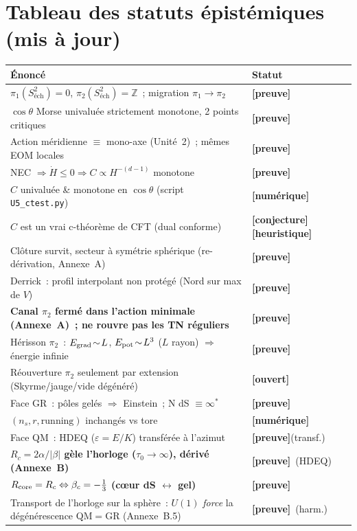 \documentclass[11pt]{article}
\newcommand{\preuve}{{\small\textbf{[preuve]}}}
\newcommand{\num}{{\small\textbf{[num\'erique]}}}
\newcommand{\conj}{{\small\textbf{[conjecture]}}}
\newcommand{\heur}{{\small\textbf{[heuristique]}}}
\newcommand{\ouv}{{\small\textbf{[ouvert]}}}
\newcommand{\Npole}{\mathrm{N}}
\newcommand{\Stwo}{S^2_{\text{\'ech}}}
\theoremstyle{definition}
\begin{document}
\section*{Tableau des statuts \'epist\'emiques (mis \`a jour)}
\begin{center}\footnotesize
\renewcommand{\arraystretch}{1.05}
\begin{tabular}{p{11.0cm} l}
\toprule
\textbf{\'Enonc\'e} & \textbf{Statut}\\
\midrule
$\pi_1(\Stwo)=0$, $\pi_2(\Stwo)=\mathbb{Z}$~; migration $\pi_1\to\pi_2$ & \preuve\\
$\cos\theta$ Morse univalu\'ee strictement monotone, 2 points critiques & \preuve\\
Action m\'eridienne $\equiv$ mono-axe (Unit\'e~2)~; m\^emes EOM locales & \preuve\\
NEC $\Rightarrow\dot H\le0\Rightarrow C\propto H^{-(d-1)}$ monotone & \preuve\\
$C$ univalu\'ee \& monotone en $\cos\theta$ (script \texttt{U5\_ctest.py}) & \num\\
$C$ est un vrai c-th\'eor\`eme de CFT (dual conforme) & \conj\,\heur\\
Cl\^oture survit, secteur \`a sym\'etrie sph\'erique (re-d\'erivation, Annexe~A) & \preuve\\
Derrick~: profil interpolant non prot\'eg\'e (Nord sur max de $V$) & \preuve\\
\textbf{Canal $\pi_2$ ferm\'e dans l'action minimale (Annexe~A)~; ne rouvre pas les TN r\'eguliers} & \preuve\\
H\'erisson $\pi_2$~: $E_{\rm grad}\!\sim\!L$, $E_{\rm pot}\!\sim\!L^3$ ($L$ rayon) $\Rightarrow$ \'energie infinie & \preuve\\
R\'eouverture $\pi_2$ seulement par extension (Skyrme/jauge/vide d\'eg\'en\'er\'e) & \ouv\\
Face GR~: p\^oles gel\'es $\Rightarrow$ Einstein~; $\Npole$ dS $\equiv\infty^\ast$ & \preuve\\
$(n_s,r,\text{running})$ inchang\'es vs tore & \num\\
Face QM~: HDEQ ($\varepsilon=E/K$) transf\'er\'ee \`a l'azimut & \preuve(transf.)\\
\textbf{$R_c=2\alpha/|\beta|$ g\`ele l'horloge ($\tau_0\!\to\!\infty$), d\'eriv\'e (Annexe~B)} & \preuve\ (HDEQ)\\
\textbf{$R_{\rm core}=R_c\Leftrightarrow\beta_c=-\tfrac13$ (c\oe ur dS $\leftrightarrow$ gel)} & \preuve\\
Transport de l'horloge sur la sph\`ere~: $U(1)$ \emph{force} la d\'eg\'en\'erescence QM$=$GR (Annexe~B.5) & \preuve\ (harm.)\\

\end{tabular}
\end{center}
\end{document}
